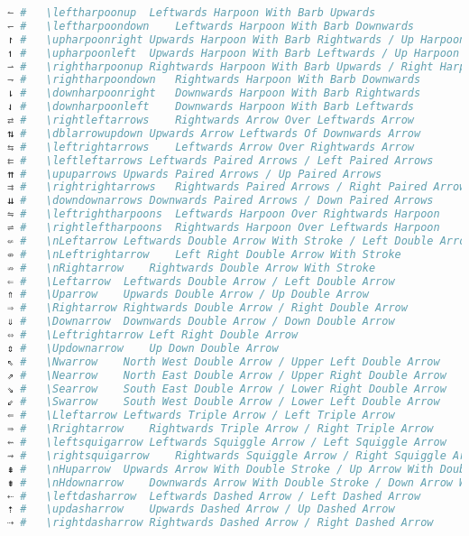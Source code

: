 \begin{lstlisting}[language=Julia, style=julia, linewidth=\textwidth]
↼ #   \leftharpoonup  Leftwards Harpoon With Barb Upwards
↽ #   \leftharpoondown    Leftwards Harpoon With Barb Downwards
↾ #   \upharpoonright Upwards Harpoon With Barb Rightwards / Up Harpoon With Barb Right
↿ #   \upharpoonleft  Upwards Harpoon With Barb Leftwards / Up Harpoon With Barb Left
⇀ #   \rightharpoonup Rightwards Harpoon With Barb Upwards / Right Harpoon With Barb Up
⇁ #   \rightharpoondown   Rightwards Harpoon With Barb Downwards
⇂ #   \downharpoonright   Downwards Harpoon With Barb Rightwards
⇃ #   \downharpoonleft    Downwards Harpoon With Barb Leftwards
⇄ #   \rightleftarrows    Rightwards Arrow Over Leftwards Arrow
⇅ #   \dblarrowupdown Upwards Arrow Leftwards Of Downwards Arrow
⇆ #   \leftrightarrows    Leftwards Arrow Over Rightwards Arrow
⇇ #   \leftleftarrows Leftwards Paired Arrows / Left Paired Arrows
⇈ #   \upuparrows Upwards Paired Arrows / Up Paired Arrows
⇉ #   \rightrightarrows   Rightwards Paired Arrows / Right Paired Arrows
⇊ #   \downdownarrows Downwards Paired Arrows / Down Paired Arrows
⇋ #   \leftrightharpoons  Leftwards Harpoon Over Rightwards Harpoon
⇌ #   \rightleftharpoons  Rightwards Harpoon Over Leftwards Harpoon
⇍ #   \nLeftarrow Leftwards Double Arrow With Stroke / Left Double Arrow With Stroke
⇎ #   \nLeftrightarrow    Left Right Double Arrow With Stroke
⇏ #   \nRightarrow    Rightwards Double Arrow With Stroke
⇐ #   \Leftarrow  Leftwards Double Arrow / Left Double Arrow
⇑ #   \Uparrow    Upwards Double Arrow / Up Double Arrow
⇒ #   \Rightarrow Rightwards Double Arrow / Right Double Arrow
⇓ #   \Downarrow  Downwards Double Arrow / Down Double Arrow
⇔ #   \Leftrightarrow Left Right Double Arrow
⇕ #   \Updownarrow    Up Down Double Arrow
⇖ #   \Nwarrow    North West Double Arrow / Upper Left Double Arrow
⇗ #   \Nearrow    North East Double Arrow / Upper Right Double Arrow
⇘ #   \Searrow    South East Double Arrow / Lower Right Double Arrow
⇙ #   \Swarrow    South West Double Arrow / Lower Left Double Arrow
⇚ #   \Lleftarrow Leftwards Triple Arrow / Left Triple Arrow
⇛ #   \Rrightarrow    Rightwards Triple Arrow / Right Triple Arrow
⇜ #   \leftsquigarrow Leftwards Squiggle Arrow / Left Squiggle Arrow
⇝ #   \rightsquigarrow    Rightwards Squiggle Arrow / Right Squiggle Arrow
⇞ #   \nHuparrow  Upwards Arrow With Double Stroke / Up Arrow With Double Stroke
⇟ #   \nHdownarrow    Downwards Arrow With Double Stroke / Down Arrow With Double Stroke
⇠ #   \leftdasharrow  Leftwards Dashed Arrow / Left Dashed Arrow
⇡ #   \updasharrow    Upwards Dashed Arrow / Up Dashed Arrow
⇢ #   \rightdasharrow Rightwards Dashed Arrow / Right Dashed Arrow

\end{lstlisting}
